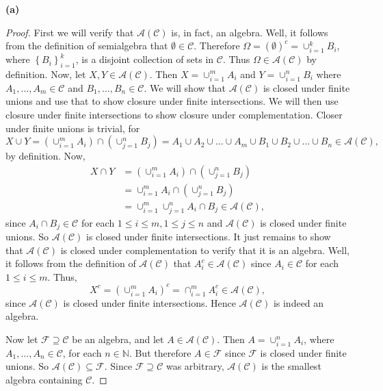 \documentclass[12pt]{article}
\begin{document}
{\bf (a)} 
\begin{proof}
First we will verify that $\mathcal{A}(\mathcal{C})$ is, in fact, an algebra. Well, it follows from the definition of semialgebra that $\emptyset \in
\mathcal{C}$. Therefore $\Omega = (\emptyset)^{c} = \cup_{i=1}^{k}B_{i}$, where $\left\{ B_{i} \right\}_{i=1}^{k}$, is a disjoint collection of sets
in $\mathcal{C}$. Thus $\Omega \in \mathcal{A}(\mathcal{C})$ by definition. Now, let $X, Y \in \mathcal{A}(\mathcal{C})$. Then $X =
\cup_{i=1}^{m}A_{i}$ and $Y = \cup_{i=1}^{n}B_{i}$ where $A_{1}, \dots, A_{m} \in \mathcal{C}$ and $B_{1}, \dots, B_{n} \in \mathcal{C}$. 
We will show that $\mathcal{A}(\mathcal{C})$ is closed under finite unions and use that to show closure under finite intersections. We will then use
closure under finite intersections to show closure under complementation. Closer under finite unions is trivial, for
\[ X\cup Y = \left( \cup_{i=1}^{m}A_{i} \right) \cap \left( \cup_{j=1}^{n}B_{j} \right) = A_{1} \cup A_{2} \cup \dots \cup A_{m} \cup B_{1} \cup B_{2}
\cup \dots \cup B_{n} \in \mathcal{A}(\mathcal{C}), \]
by definition. Now,
\begin{align*}
X \cap Y & = \left( \cup_{i=1}^{m}A_{i} \right) \cap \left( \cup_{j=1}^{n}B_{j} \right) \\
& = \cup_{i=1}^{m}A_{i} \cap \left( \cup_{j=1}^{n}B_{j} \right) \\
& = \cup_{i=1}^{m}\cup_{j=1}^{n}A_{i}\cap B_{j} \in \mathcal{A}(\mathcal{C}),
\end{align*}
since $A_{i}\cap B_{j} \in \mathcal{C}$ for each $1\leq i \leq m, 1\leq j \leq n$ and $\mathcal{A}(\mathcal{C})$ is closed under finite unions. So
$\mathcal{A}(\mathcal{C})$ is closed under finite intersections. It just remains to show that $\mathcal{A}(\mathcal{C})$ is closed under
complementation to verify that it is an algebra. Well, it follows from the definition of $\mathcal{A}(\mathcal{C})$ that $A_{i}^{c} \in \mathcal{A}(\mathcal{C})$ since $A_{i} \in \mathcal{C}$ for each $1 \leq i \leq
m$. Thus,
\[ X^{c} = \left( \cup_{i=1}^{m}A_{i} \right)^{c} = \cap_{i=1}^{m}A_{i}^{c} \in \mathcal{A}(\mathcal{C}), \]
since $\mathcal{A}(\mathcal{C})$ is closed under finite intersections. Hence $\mathcal{A}(\mathcal{C})$ is indeed an algebra.

Now let $\mathcal{F} \supseteq \mathcal{C}$ be an algebra, and let $A \in \mathcal{A}(\mathcal{C})$. Then $A = \cup_{i=1}^{n}A_{i}$, where $A_{1},
\dots, A_{n} \in \mathcal{C}$, for each $n \in \mathbb{N}$. But therefore $A \in \mathcal{F}$ since $\mathcal{F}$ is closed under finite unions. So
$\mathcal{A}(\mathcal{C}) \subseteq \mathcal{F}$. Since $\mathcal{F} \supseteq \mathcal{C}$ was arbitrary, $\mathcal{A}(\mathcal{C})$ is the smallest
algebra containing $\mathcal{C}$.
\end{proof}
\end{document}
